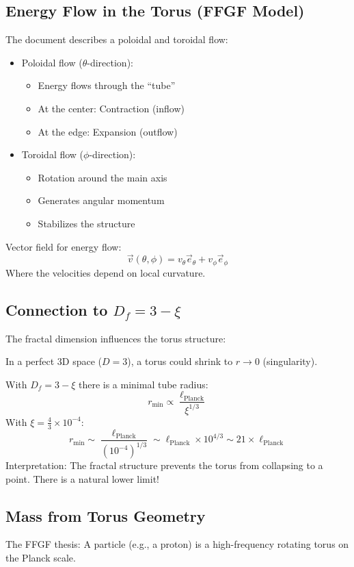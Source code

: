 \subsection{Energy Flow in the Torus (FFGF Model)}
The document describes a poloidal and toroidal flow:
\begin{itemize}
	\item Poloidal flow (\( \theta \)-direction):
	\begin{itemize}
		\item Energy flows through the ``tube''
		\item At the center: Contraction (inflow)
		\item At the edge: Expansion (outflow)
	\end{itemize}
	\item Toroidal flow (\( \phi \)-direction):
	\begin{itemize}
		\item Rotation around the main axis
		\item Generates angular momentum
		\item Stabilizes the structure
	\end{itemize}
\end{itemize}

Vector field for energy flow:
\[
\vec{v}(\theta, \phi) = v_\theta \vec{e}_\theta + v_\phi \vec{e}_\phi
\]
Where the velocities depend on local curvature.

\subsection{Connection to \( D_f = 3 - \xi \)}
The fractal dimension influences the torus structure:

In a perfect 3D space (\( D = 3 \)), a torus could shrink to \( r \to 0 \) (singularity).

With \( D_f = 3 - \xi \) there is a minimal tube radius:
\[
r_{\text{min}} \propto \frac{\ell_{\text{Planck}}}{\xi^{1/3}}
\]
With \( \xi = \frac{4}{3} \times 10^{-4} \):
\[
r_{\text{min}} \sim \frac{\ell_{\text{Planck}}}{(10^{-4})^{1/3}} \sim \ell_{\text{Planck}} \times 10^{4/3} \sim 21 \times \ell_{\text{Planck}}
\]
Interpretation: The fractal structure prevents the torus from collapsing to a point. There is a natural lower limit!

\subsection{Mass from Torus Geometry}
The FFGF thesis: A particle (e.g., a proton) is a high-frequency rotating torus on the Planck scale.


